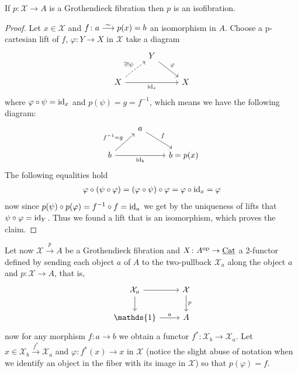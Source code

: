 \begin{lem}
	If $ p \colon \mathcal{ X } \to A $ is a Grothendieck fibration then $ p $ is an isofibration.
\end{lem}

\begin{proof}
	Let $ x \in \mathcal{ X } $ and $ f \colon a \isomorphism p ( x ) = b $ an isomorphism in $ A $.
	Choose a p-cartesian lift of $ f $, $ \varphi \colon Y \to X $ in $ \mathcal{ X } $ take a diagram 
	\[
	\begin{tikzcd}
		&
		Y
		\ar[rd, " \varphi "]
		\\
		X
		\ar[ru, dashed, " \exists ! \psi "]
		\ar[rr, " \id_* "']
		&&
		X
	\end{tikzcd}
	\]
	where $ \varphi \circ \psi = \operatorname{id}_x $ and $ p ( \psi ) = g = f^{-1} $, which means we have the following diagram: 
	\[
	\begin{tikzcd}
		&
		a 
		\ar[rd, " f "]
		\\
		b
		\ar[ru, " f^{ - 1 } = g "]
		\ar[rr, " \id_b"']
		&&
		b = p ( x )
	\end{tikzcd}	
	\]
	The following equalities hold 
	\begin{align*}
		\varphi \circ ( \psi \circ \varphi ) = ( \varphi \circ \psi ) \circ \varphi = \varphi \circ \operatorname{id}_x = \varphi 
	\end{align*}
	now since $ p ( \psi ) \circ p ( \varphi ) =  f^{ - 1 } \circ f = \operatorname{id}_a $
	we get by the uniqueness of lifts that $ \psi \circ \varphi = \operatorname{id}_Y $.
	Thus we found a lift that is an isomorphism, which proves the claim.
\end{proof}

Let now $ \mathcal{ X } \xrightarrow{ p } A $ be a Grothendieck fibration and $ X \colon A^{ \operatorname{op} } \to \underline{\operatorname{Cat}} $ a 2-functor
defined by sending each object  $ a $ of $ A $ to the two-pullback $ \mathcal{ X }_a $ along the object $ a $ and $ p \colon \mathcal{ X } \to A $, that is,
\[
\begin{tikzcd}		
	\mathcal{X}_a 
	\ar[r]
	\ar[d]
	&
	\mathcal{X}
	\ar[d,"p"]
	\\
	\mathds{1}
	\ar[r,"a"]
	&
	A
\end{tikzcd}
\]
now for any morphism $ f \colon a \to b $ we obtain a functor $ f^* \colon \mathcal{ X }_b \to \mathcal{ X }_a $.
Let $ x \in \mathcal{ X }_b \xrightarrow{ f^* } \mathcal{ X }_a $
and $ \varphi \colon f^* ( x ) \to x $ in $ \mathcal{X} $ (notice the slight abuse of notation when we identify an object in the fiber with its image in $ \mathcal{ X } $) so that $ p ( \varphi ) = f $.

